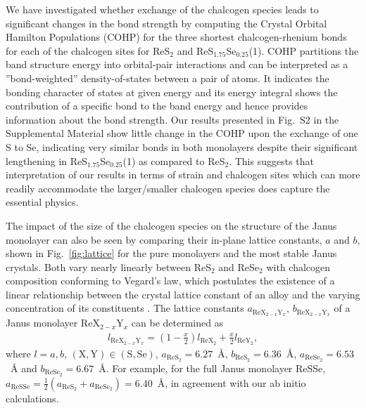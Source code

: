 \documentclass[reprint, superscriptaddress, amsmath,amssymb,prb,twocolumn]{revtex4-2}
\begin{document}
We have investigated whether exchange of the chalcogen species leads to significant changes in the bond strength by computing the Crystal Orbital Hamilton Populations (COHP) \cite{dronskowski_jpc_1993} for the three shortest chalcogen-rhenium bonds for each of the chalcogen sites for ReS$_{2}$ and ReS$_{1.75}$Se$_{0.25}$(1). COHP partitions the band structure energy into orbital-pair interactions and can be interpreted as a ''bond-weighted'' density-of-states between a pair of atoms. It indicates the bonding character of states at given energy and its energy integral shows the contribution of a specific bond to the band energy and hence provides information about the bond strength. Our results presented in Fig.~S2 in the Supplemental Material \cite{SM} show little change in the COHP upon the exchange of one S to Se, indicating very similar bonds in both monolayers despite their significant lengthening in ReS$_{1.75}$Se$_{0.25}$(1) as compared to ReS$_{2}$. This suggests that interpretation of our results in terms of strain and chalcogen sites which can more readily accommodate the larger/smaller chalcogen species does capture the essential physics. 


The impact of the size of the chalcogen species on the structure of the Janus monolayer can also be seen by comparing their in-plane lattice constants, $a$ and $b$, shown in Fig.~\ref{fig:lattice}  for the pure monolayers and the most stable Janus crystals. Both vary nearly linearly between ReS$_{2}$ and ReSe$_{2}$ with chalcogen composition conforming to Vegard's law, which postulates the existence of a linear relationship between the crystal lattice constant of an alloy and the varying concentration of its constituents \cite{vegard_zphys_1921}. The lattice constants %
$a_{\mathrm{ReX}_{2-x}\mathrm{Y}_{x}}$, $b_{\mathrm{ReX}_{2-x}\mathrm{Y}_{x}}$ of a Janus monolayer ReX$_{2-x}$Y$_{x}$ can be determined as
\begin{align}
l_{\mathrm{ReX}_{2-x}\mathrm{Y}_{x}}=\left(1-\frac{x}{2}\right)l_{\mathrm{ReX}_{2}}+\frac{x}{2}l_{\mathrm{ReY}_{2}},
\end{align}
where $l=a,b$, $\mathrm{(X,Y)\in(S,Se)}$, {$a_{\mathrm{ReS}_{2}}=6.27$~\AA}, {$b_{\mathrm{ReS}_{2}}=6.36$~\AA}, {$a_{\mathrm{ReSe}_{2}}=6.53$~\AA} and {$b_{\mathrm{ReSe}_{2}}=6.67$~\AA}. For example, for the full Janus monolayer ReSSe, $a_{\mathrm{ReSSe}}=\tfrac{1}{2}(a_{\mathrm{ReS}_{2}}+a_{\mathrm{ReSe}_{2}})=6.40$~\AA, in agreement with our ab initio calculations.
\end{document}
